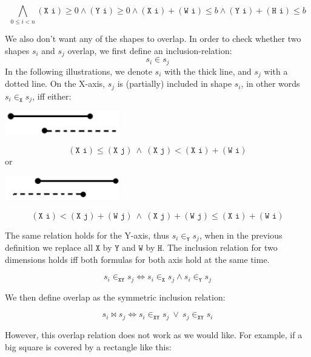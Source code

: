 \documentclass[12pt]{article}
\begin{document}
\[ \bigwedge_{0 \le i < n}
(\texttt{X i}) \ge 0 \wedge
(\texttt{Y i}) \ge 0 \wedge
(\texttt{X i})+(\texttt{W i}) \le b \wedge
(\texttt{Y i})+(\texttt{H i}) \le b
\]

We also don't want any of the shapes to overlap.
In order to check whether two shapes $s_i$ and $s_j$ overlap, we first define an inclusion-relation:
\[ s_i \in s_j \]
In the following illustrations, we denote $s_i$ with the thick line, and $s_j$ with a dotted line.
On the X-axis, $s_j$ is (partially) included in shape $s_i$, in other words $s_i \in_{\texttt{X}} s_j$, iff either:

\begin{center}
    \includegraphics[width=5cm]{bounds1.png}
\end{center}
\[ (\texttt{X i}) \le (\texttt{X j}) ~\wedge~ (\texttt{X j}) < (\texttt{X i}) + (\texttt{W i}) \]
or
\begin{center}
    \includegraphics[width=5cm]{bounds2.png}
\end{center}
\[ (\texttt{X i}) < (\texttt{X j}) + (\texttt{W j}) ~\wedge~ (\texttt{X j}) + (\texttt{W j}) \le (\texttt{X i}) + (\texttt{W i}) \]

The same relation holds for the Y-axis, thus $s_i \in_{\texttt{Y}} s_j$, when in the previous definition we replace all $\texttt{X}$ by $\texttt{Y}$ and $\texttt{W}$ by $\texttt{H}$.
The inclusion relation for two dimensions holds iff both formulas for both axis hold at the same time.

\[ s_i \in_{\texttt{XY}} s_j \iff s_i \in_{\texttt{X}} s_j \wedge s_i \in_{\texttt{Y}} s_j \]

We then define overlap as the symmetric inclusion relation:

\[ s_i \bowtie s_j \iff s_i \in_{\texttt{XY}} s_j ~\vee~ s_j \in_{\texttt{XY}} s_i \]

However, this overlap relation does not work as we would like.
For example, if a big square is covered by a rectangle like this:
\begin{center}
\end{center}
\end{document}
